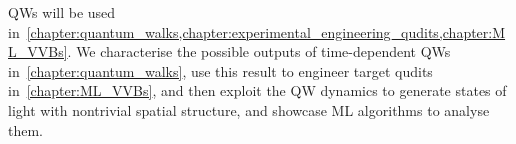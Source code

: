 QWs will be used in~\cref{chapter:quantum_walks,chapter:experimental_engineering_qudits,chapter:ML_VVBs}. We characterise the possible outputs of time-dependent QWs in~\cref{chapter:quantum_walks}, use this result to engineer target qudits in~\cref{chapter:ML_VVBs}, and then exploit the QW dynamics to generate states of light with nontrivial spatial structure, and showcase ML algorithms to analyse them.

